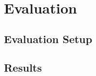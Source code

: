 \chapter{Evaluation}
\label{ch:evaluation}


\section{Evaluation Setup}
\label{sec:evaluation:setup}


\section{Results}
\label{sec:evaluation:results}


